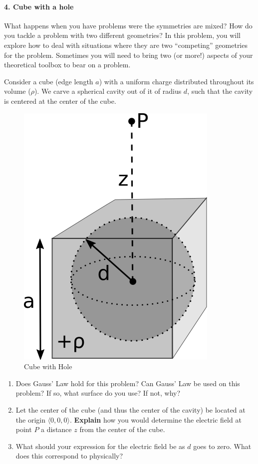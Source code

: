 \documentclass[11pt]{article}
\def\tightlist{}
\begin{document}
\paragraph{4. Cube with a hole}\label{cube-with-a-hole}

What happens when you have problems were the symmetries are mixed? How
do you tackle a problem with two different geometries? In this problem,
you will explore how to deal with situations where they are two
``competing'' geometries for the problem. Sometimes you will need to
bring two (or more!) aspects of your theoretical toolbox to bear on a
problem.

Consider a cube (edge length \(a\)) with a uniform charge distributed
throughout its volume (\(\rho\)). We carve a spherical cavity out of it
of radius \(d\), such that the cavity is centered at the center of the
cube.

\begin{figure}[htbp]
\centering
\includegraphics{./images/hw3/cube_w_hole.png}
\caption{Cube with Hole}
\end{figure}

\begin{enumerate}
\def\labelenumi{\arabic{enumi}.}
\tightlist
\item
  Does Gauss' Law hold for this problem? Can Gauss' Law be used on this
  problem? If so, what surface do you use? If not, why?
\item
  Let the center of the cube (and thus the center of the cavity) be
  located at the origin \(\langle 0,0,0 \rangle\). \textbf{Explain} how
  you would determine the electric field at point \(P\) a distance \(z\)
  from the center of the cube.
\item
  What should your expression for the electric field be as \(d\) goes to
  zero. What does this correspond to physically?
\end{enumerate}
\end{document}
